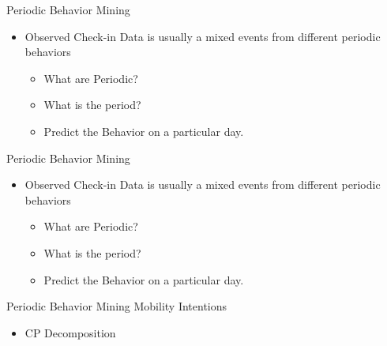 \documentclass[
 size=14pt,
 paper=smartboard,  %
 mode=present, 		%
 display=slides, 	%
 style=tuliplab,  	%
 pauseslide,
 fleqn,leqno]{powerdot}
\begin{document}
\begin{slide}[toc=,bm=]{Periodic Behavior Mining}

\begin{itemize}
\item
Observed Check-in Data is usually a mixed events from different periodic behaviors

\begin{itemize}
\item
What are Periodic?

\item
What is the period?

\item
Predict the Behavior on a particular day.
\end{itemize}

\end{itemize}

\end{slide}


\begin{slide}[toc=,bm=]{Periodic Behavior Mining}

\begin{itemize}
\item
Observed Check-in Data is usually a mixed events from different periodic behaviors

    \begin{itemize}
    \item
    What are Periodic?

    \item
    What is the period?

    \item
    Predict the Behavior on a particular day.

    \end{itemize}
\end{itemize}

\end{slide}


\begin{slide}[toc=,bm=]{Periodic Behavior Mining Mobility Intentions}

\begin{itemize}
\item
CP Decomposition

\end{itemize}

\end{slide}
\end{document}
